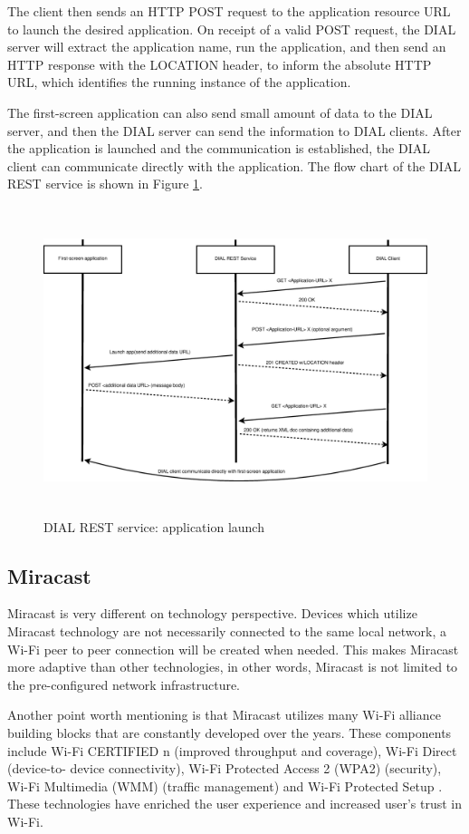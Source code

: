 The client then sends an HTTP POST request to the application resource URL to 
launch the desired application. On receipt of a valid POST request, the DIAL 
server will extract the application name, run the application, and then send 
an HTTP response with the LOCATION header, to inform the absolute HTTP URL, which 
identifies the running instance of the application.

The first-screen application can also send small amount of data to the DIAL 
server, and then the DIAL server can send the information to DIAL clients. 
After the application is launched and the communication is established, the DIAL 
client can communicate directly with the application. The flow chart of  the
DIAL REST service is  shown in Figure \ref{dial_rest}.
\begin{figure}[htb] \centering \includegraphics[height=9cm]{charts/dial_rest} 
\caption{DIAL REST service: application launch \label{dial_rest}} 
\end{figure} 

\subsection{Miracast\label{2_2_5}} %
Miracast \cite{miracast_industry} is very different on technology perspective.
Devices which utilize Miracast technology are not necessarily connected to
the same local network, a Wi-Fi peer to peer connection will be created when
needed. This makes Miracast more adaptive than other technologies, in other
words, Miracast is not limited to the pre-configured network infrastructure.

Another point worth mentioning is that Miracast utilizes many Wi-Fi alliance
building blocks that are constantly developed over the years. These components
include Wi-Fi CERTIFIED n (improved throughput and coverage), Wi-Fi Direct
(device-to- device connectivity), Wi-Fi Protected Access 2 (WPA2) (security),
Wi-Fi Multimedia (WMM) (traffic management) and Wi-Fi Protected
Setup \cite{miracast_industry}. These technologies have enriched the user
experience and increased user's trust in Wi-Fi.

